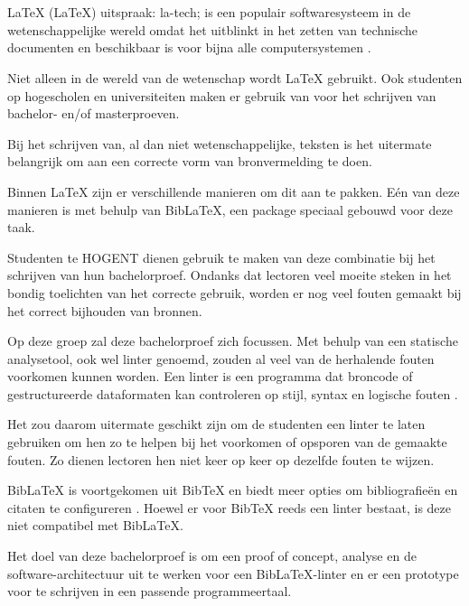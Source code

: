 
\chapter{}%
\label{ch:inleiding}
LaTeX (\LaTeX{}) uitspraak: la-tech; is een populair softwaresysteem in de wetenschappelijke wereld omdat het uitblinkt in het zetten van technische documenten
en beschikbaar is voor bijna alle computersystemen \autocite{Oetiker2023}.

Niet alleen in de wereld van de wetenschap wordt \LaTeX{} gebruikt. Ook studenten op hogescholen en universiteiten maken er gebruik van voor het schrijven van bachelor- en/of masterproeven.

Bij het schrijven van, al dan niet wetenschappelijke, teksten is het uitermate belangrijk om aan een correcte vorm van bronvermelding te doen.

Binnen \LaTeX{} zijn er verschillende manieren om dit aan te pakken. Eén van deze manieren is met behulp van BibLaTeX, een package speciaal gebouwd voor deze taak.

Studenten te HOGENT dienen gebruik te maken van deze combinatie bij het schrijven van hun bachelorproef. Ondanks dat lectoren veel moeite steken in het bondig toelichten van het correcte gebruik, worden er nog veel fouten gemaakt bij het correct bijhouden van bronnen. 

Op deze groep zal deze bachelorproef zich focussen. Met behulp van een statische analysetool, ook wel linter genoemd, zouden al veel van de herhalende fouten voorkomen kunnen worden. Een linter is een programma dat broncode of gestructureerde dataformaten kan controleren op stijl, syntax en logische fouten \autocite{Kamunya2023}.

Het zou daarom uitermate geschikt zijn om de studenten een linter te laten gebruiken om hen zo te helpen bij het voorkomen of opsporen van de gemaakte fouten. Zo dienen lectoren hen niet keer op keer op dezelfde fouten te wijzen.

BibLaTeX is voortgekomen uit BibTeX en biedt meer opties om bibliografieën en citaten te configureren \autocite{Cassidy2013}. Hoewel er voor BibTeX reeds een linter bestaat, is deze niet compatibel met BibLaTeX.

Het doel van deze bachelorproef is om een proof of concept, analyse en de software-architectuur uit te werken voor een BibLaTeX-linter en er een prototype voor te schrijven in een passende programmeertaal. 

